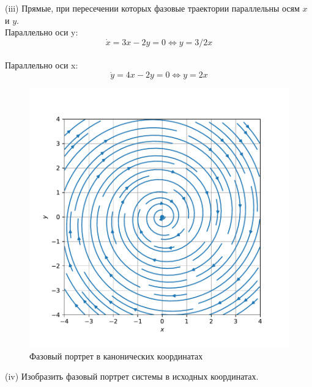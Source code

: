 \documentclass[a4paper, 12pt]{article}
\begin{document}
(iii) Прямые, при пересечении которых фазовые траектории параллельны осям $x$ и $y$.\\
Параллельно оси y:
\[\dot{x} = 3x-2y=0\Leftrightarrow y = 3/2x\]\\
Параллельно оси x:
\[\dot{y} = 4x-2y=0\Leftrightarrow y = 2x\]
\begin{figure}[H]
	\centering
	\includegraphics[scale=0.8]{2a1_0}
	\caption{Фазовый портрет в канонических координатах}
	\label{im:1a1_0}
\end{figure}



(iv) Изобразить фазовый портрет системы в исходных координатах.
\end{document}
